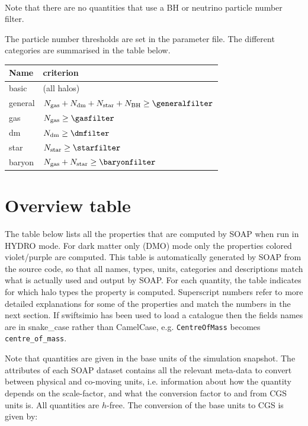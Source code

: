 \documentclass{article}
\begin{document}
\paragraph{}Note that there are no quantities that use a BH or neutrino particle number filter.

The particle number thresholds are set in the parameter file. The different categories are summarised in the table below.

\begin{longtable}{ll}
Name & criterion \\
\hline{}basic & (all halos) \\
general & $N_{\rm{}gas}+N_{\rm{}dm}+N_{\rm{}star}+N_{\rm{}BH} \geq{} \generalfilter$ \\
gas & $N_{\rm{}gas} \geq{} \gasfilter$ \\
dm & $N_{\rm{}dm} \geq{} \dmfilter$ \\
star & $N_{\rm{}star} \geq{} \starfilter$ \\
baryon & $N_{\rm{}gas}+N_{\rm{}star} \geq{} \baryonfilter$ \\
\end{longtable}

\section{Overview table}

The table below lists all the properties that are computed by SOAP when run in HYDRO mode.
For dark matter only (DMO) mode only the properties colored violet/purple are computed.
This table is automatically generated by 
SOAP from the source code, so that all names, types, units, categories and descriptions match what is actually
used and output by SOAP. For each quantity, the table indicates for which halo types the property is computed.
Superscript numbers refer to more detailed explanations for some of the properties and match the numbers in
the next section. If swiftsimio has been used to load a catalogue then the fields names are in snake\_case rather
than CamelCase, e.g. \verb+CentreOfMass+ becomes \verb+centre_of_mass+.

Note that quantities are given in the base units of the simulation snapshot. The attributes of each SOAP dataset contains
all the relevant meta-data to convert between physical and co-moving units, i.e. information about how the
quantity depends on the scale-factor, and what the conversion factor to and from CGS units is. All quantities
are $h$-free. The conversion of the base units to CGS is given by:
\end{document}
